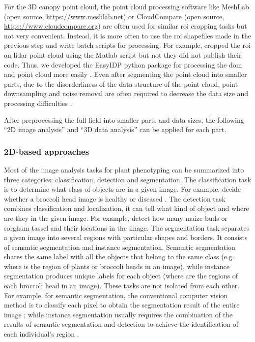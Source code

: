 For the 3D canopy point cloud, the point cloud processing software like MeshLab (open source, \url{https://www.meshlab.net}) or CloudCompare (open source, \url{https://www.cloudcompare.org}) are often used for similar \gls{roi} cropping tasks but not very convenient. Instead, it is more often to use the \gls{roi} shapefiles made in the previous step and write batch scripts for processing. For example, \citet{sun_field_2018} cropped the \gls{roi} on \gls{lidar} point cloud using the Matlab script but not they did not publish their code. Thus, we developed the EasyIDP python package for processing the \gls{dom} and point cloud more easily \citep{wang_easyidp_2021}. Even after segmenting the point cloud into smaller parts, due to the disorderliness of the data structure of the point cloud, point downsampling and noise removal are often required to decrease the data size and processing difficulties \citep{ma_calculation_2019}. 

After preprocessing the full field into smaller parts and data sizes, the following ``2D image analysis'' and ``3D data analysis'' can be applied for each part.

\subsubsection{2D-based approaches}

Most of the image analysis tasks for plant phenotyping can be summarized into three categories: classification, detection and segmentation. The classification task is to determine what class of objects are in a given image. For example, decide whether a broccoli head image is healthy or diseased \citep{garcia_towards_2021}. The detection task combines classification and localization, it can tell what kind of object and where are they in the given image. For example, detect how many maize buds \citep{liu_estimating_2022} or sorghum tassel \citep{ghosal_weakly_2019} and their locations in the image. The segmentation task separates a given image into several regions with particular shapes and borders. It consists of semantic segmentation and instance segmentation. Semantic segmentation shares the same label with all the objects that belong to the same class (e.g. where is the region of plants or broccoli heads in an image), while instance segmentation produces unique labels for each object (where are the regions of each broccoli head in an image). These tasks are not isolated from each other. For example, for semantic segmentation, the conventional computer vision method is to classify each pixel to obtain the segmentation result of the entire image \citep{guo_easypcc_2017}; while instance segmentation usually requires the combination of the results of semantic segmentation and detection to achieve the identification of each individual's region \citep[Fig.~2]{luling_using_2021}.

